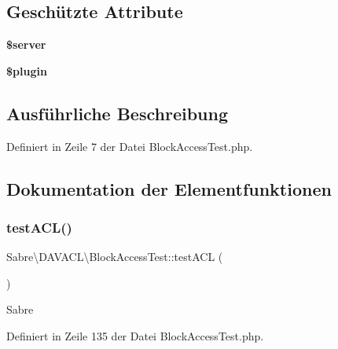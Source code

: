 \subsection*{Geschützte Attribute}
\begin{DoxyCompactItemize}
\item 
\mbox{\label{class_sabre_1_1_d_a_v_a_c_l_1_1_block_access_test_ab47011b2627d3df001e9643cb732680c}} 
{\bfseries \$server}
\item 
\mbox{\label{class_sabre_1_1_d_a_v_a_c_l_1_1_block_access_test_a365642b682e8e1d08665f2180f0b8106}} 
{\bfseries \$plugin}
\end{DoxyCompactItemize}


\subsection{Ausführliche Beschreibung}


Definiert in Zeile 7 der Datei Block\+Access\+Test.\+php.



\subsection{Dokumentation der Elementfunktionen}
\mbox{\label{class_sabre_1_1_d_a_v_a_c_l_1_1_block_access_test_ac1b7196f53f5b0bc7bc41efb0ded5465}} 
\subsubsection{\texorpdfstring{test\+A\+C\+L()}{testACL()}}
{\footnotesize\ttfamily Sabre\textbackslash{}\+D\+A\+V\+A\+C\+L\textbackslash{}\+Block\+Access\+Test\+::test\+A\+CL (\begin{DoxyParamCaption}{ }\end{DoxyParamCaption})}

Sabre 

Definiert in Zeile 135 der Datei Block\+Access\+Test.\+php.

